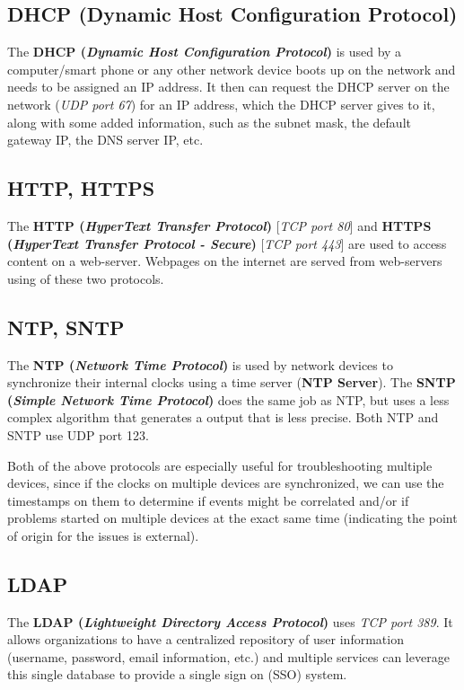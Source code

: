 \subsection{DHCP (Dynamic Host Configuration Protocol)}
The \textbf{DHCP (\textit{Dynamic Host Configuration Protocol})} is used by a computer/smart phone or any other network device boots up on the network and needs to be assigned an IP address. It then can request the DHCP server on the network (\textit{UDP port 67}) for an IP address, which the DHCP server gives to it, along with some added information, such as the subnet mask, the default gateway IP, the DNS server IP, etc. 

\subsection{HTTP, HTTPS}
The \textbf{HTTP (\textit{HyperText Transfer Protocol})} [\textit{TCP port 80}] and \textbf{HTTPS (\textit{HyperText Transfer Protocol - Secure})} [\textit{TCP port 443}] are used to access content on a web-server. Webpages on the internet are served from web-servers using of these two protocols. 

\subsection{NTP, SNTP}
The \textbf{NTP (\textit{Network Time Protocol})} is used by network devices to synchronize their internal clocks using a time server (\textbf{NTP Server}). The \textbf{SNTP (\textit{Simple Network Time Protocol})} does the same job as NTP, but uses a less complex algorithm that generates a output that is less precise. Both NTP and SNTP use UDP port 123. 

Both of the above protocols are especially useful for troubleshooting multiple devices, since if the clocks on multiple devices are synchronized, we can use the timestamps on them to determine if events might be correlated and/or if problems started on multiple devices at the exact same time (indicating the point of origin for the issues is external). 

\subsection{LDAP}
The \textbf{LDAP (\textit{Lightweight Directory Access Protocol})} uses \textit{TCP port 389}. It allows organizations to have a centralized repository of user information (username, password, email information, etc.) and multiple services can leverage this single database to provide a single sign on (SSO) system. 

